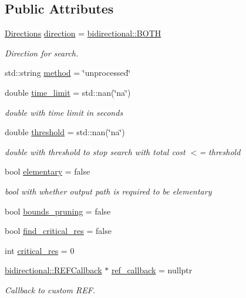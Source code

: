 \subsection*{Public Attributes}
\begin{DoxyCompactItemize}
\item 
\hyperlink{namespacebidirectional_a4cbe6f0bfbd3629c2cd44c98014aed70}{Directions} \hyperlink{classbidirectional_1_1Params_a1d461034d1a1e04fa7f00cb63cd230d8}{direction} = \hyperlink{namespacebidirectional_a4cbe6f0bfbd3629c2cd44c98014aed70ab50b3fbd895a667b43b3e9eb3bd54f85}{bidirectional\+::\+B\+O\+TH}
\begin{DoxyCompactList}\small\item\em Direction for search. \end{DoxyCompactList}\item 
std\+::string \hyperlink{classbidirectional_1_1Params_a2faf36e89993c9fd0979e3e42b2332ea}{method} = \char`\"{}unprocessed\char`\"{}
\item 
double \hyperlink{classbidirectional_1_1Params_a2c0fd34b19d753cfce75690a5d68e1e1}{time\+\_\+limit} = std\+::nan(\char`\"{}na\char`\"{})
\begin{DoxyCompactList}\small\item\em double with time limit in seconds \end{DoxyCompactList}\item 
double \hyperlink{classbidirectional_1_1Params_ac7099f442d46b684fcbe55ba9c6657e4}{threshold} = std\+::nan(\char`\"{}na\char`\"{})
\begin{DoxyCompactList}\small\item\em double with threshold to stop search with total cost $<$= threshold \end{DoxyCompactList}\item 
bool \hyperlink{classbidirectional_1_1Params_aa19060565463ffc251019a1dea026e6d}{elementary} = false
\begin{DoxyCompactList}\small\item\em bool with whether output path is required to be elementary \end{DoxyCompactList}\item 
bool \hyperlink{classbidirectional_1_1Params_a1a452cc4956571752b946165a899f850}{bounds\+\_\+pruning} = false
\item 
bool \hyperlink{classbidirectional_1_1Params_aafe66809d74beb22c445a72ca7955f85}{find\+\_\+critical\+\_\+res} = false
\item 
int \hyperlink{classbidirectional_1_1Params_a7d318c4af901a82c3f566d59c6de1b62}{critical\+\_\+res} = 0
\item 
\hyperlink{classbidirectional_1_1REFCallback}{bidirectional\+::\+R\+E\+F\+Callback} $\ast$ \hyperlink{classbidirectional_1_1Params_afa96dcebb31c930ea4bd339fc72779a5}{ref\+\_\+callback} = nullptr
\begin{DoxyCompactList}\small\item\em Callback to custom R\+EF. \end{DoxyCompactList}\end{DoxyCompactItemize}


